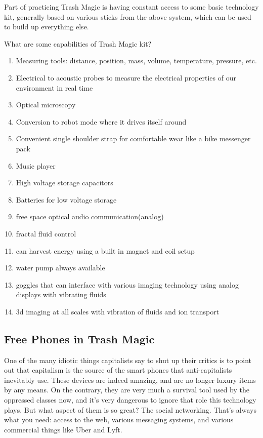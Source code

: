 Part of practicing Trash Magic is having constant access to some basic
technology kit, generally based on various sticks from the above system,
which can be used to build up everything else.

What are some capabilities of Trash Magic kit?

\begin{enumerate}
\def\labelenumi{\arabic{enumi}.}
\tightlist
\item
  Measuring tools: distance, position, mass, volume, temperature,
  pressure, etc.
\item
  Electrical to acoustic probes to measure the electrical properties of
  our environment in real time
\item
  Optical microscopy
\item
  Conversion to robot mode where it drives itself around
\item
  Convenient single shoulder strap for comfortable wear like a bike
  messenger pack
\item
  Music player
\item
  High voltage storage capacitors
\item
  Batteries for low voltage storage
\item
  free space optical audio communication(analog)
\item
  fractal fluid control
\item
  can harvest energy using a built in magnet and coil setup
\item
  water pump always available
\item
  goggles that can interface with various imaging technology using
  analog displays with vibrating fluids
\item
  3d imaging at all scales with vibration of fluids and ion transport
\end{enumerate}

\subsection{Free Phones in Trash
Magic}\label{free-phones-in-trash-magic}

One of the many idiotic things capitalists say to shut up their critics
is to point out that capitalism is the source of the smart phones that
anti-capitalists inevitably use. These devices are indeed amazing, and
are no longer luxury items by any means. On the contrary, they are very
much a survival tool used by the oppressed classes now, and it's very
dangerous to ignore that role this technology plays. But what aspect of
them is so great? The social networking. That's always what you need:
access to the web, various messaging systems, and various commercial
things like Uber and Lyft.

